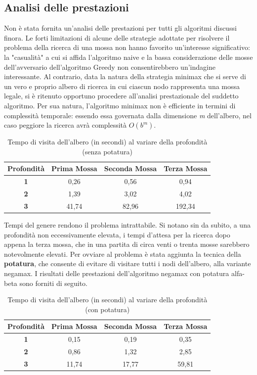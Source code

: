 \subsection{Analisi delle prestazioni}
\label{cap: Analisi}
Non è stata fornita un'analisi delle prestazioni per tutti gli algoritmi discussi finora. Le forti limitazioni di alcune delle strategie adottate per risolvere il problema della ricerca di una mossa non hanno favorito un'interesse significativo: la "casualità" a cui si affida l'algoritmo naive e la bassa considerazione delle mosse dell'avversario dell'algoritmo Greedy non consentirebbero un'indagine interessante. Al contrario, data la natura della strategia minimax che si serve di un vero e proprio albero di ricerca in cui ciascun nodo rappresenta una mossa legale, si è ritenuto opportuno procedere all'analisi prestazionale del suddetto algoritmo. Per sua natura, l'algoritmo minimax non è efficiente in termini di complessità temporale: essendo essa governata dalla dimensione \textit{m} dell'albero, nel caso peggiore la ricerca avrà complessità $O(b^m)$.

\begin{table}[!htb]
    \centering
    \begin{tabular}{|c|c|c|c|}
\hline
\textbf{Profondità} & \textbf{Prima Mossa} & \textbf{Seconda Mossa} & \textbf{Terza Mossa}\\
\hline
\textbf{1} & 0,26 & 0,56 & 0,94\\
\hline
\textbf{2} & 1,39 & 3,02 & 4,02\\
\hline
\textbf{3} & 41,74 & 82,96 & 192,34\\
\hline
\end{tabular}
    \caption{Tempo di visita dell'albero (in secondi) al variare della profondità (senza potatura)}
    \label{tab:my_label}
\end{table}

Tempi del genere rendono il problema intrattabile. Si notano sin da subito, a una profondità non eccessivamente elevata, i tempi d'attesa per la ricerca dopo appena la terza mossa, che in una partita di circa venti o trenta mosse sarebbero notevolmente elevati. Per ovviare al problema è stata aggiunta la tecnica della \textbf{potatura}, che consente di evitare di visitare tutti i nodi dell'albero, alla variante negamax. I risultati delle prestazioni dell'algoritmo negamax con potatura alfa-beta sono forniti di seguito.

\begin{table}[!htb]
    \centering
    \begin{tabular}{|c|c|c|c|}
\hline
\textbf{Profondità} & \textbf{Prima Mossa} & \textbf{Seconda Mossa} & \textbf{Terza Mossa}\\
\hline
\textbf{1} & 0,15 & 0,19 & 0,35\\
\hline
\textbf{2} & 0,86 & 1,32 & 2,85\\
\hline
\textbf{3} & 11,74 & 17,77 & 59,81\\
\hline
\end{tabular}
    \caption{Tempo di visita dell'albero (in secondi) al variare della profondità (con potatura)}
    \label{tab:my_label}
\end{table}

